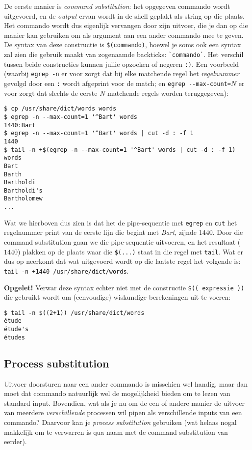 \documentclass[a4paper,twoside,openany]{memoir}
\begin{document}
De eerste manier is \emph{command substitution}: het opgegeven commando wordt
uitgevoerd, en de \emph{output} ervan wordt in de shell geplakt als string op
die plaats. Het commando wordt dus eigenlijk vervangen door zijn uitvoer, die
je dan op die manier kan gebruiken om als argument aan een ander commando mee
te geven. De syntax van deze constructie is \verb!$(commando)!, hoewel je soms
ook een syntax zal zien die gebruik maakt van zogenaamde backticks:
\verb!`commando`!. Het verschil tussen beide constructies kunnen jullie
opzoeken of negeren \verb!:)!. Een voorbeeld (waarbij \verb!egrep -n! er voor
zorgt dat bij elke matchende regel het \emph{regelnummer} gevolgd door een
\verb!:! wordt afgeprint voor de match; en \verb!egrep --max-count=!$N$ er voor
zorgt dat slechts de eerste $N$ matchende regels worden teruggegeven):

\begin{verbatim}
$ cp /usr/share/dict/words words
$ egrep -n --max-count=1 '^Bart' words
1440:Bart
$ egrep -n --max-count=1 '^Bart' words | cut -d : -f 1
1440
$ tail -n +$(egrep -n --max-count=1 '^Bart' words | cut -d : -f 1) words
Bart
Barth
Bartholdi
Bartholdi's
Bartholomew
...
\end{verbatim}

Wat we hierboven dus zien is dat het de pipe-sequentie met \verb!egrep! en
\verb!cut! het regelnummer print van de eerste lijn die begint met \emph{Bart},
zijnde $1440$. Door die command substitution gaan we die pipe-sequentie
uitvoeren, en het resultaat ($1440$) plakken op de plaats waar die
\verb!$(...)! staat in die regel met \verb!tail!. Wat er dus op neerkomt dat
wat uitgevoerd wordt op die laatste regel het volgende is: \verb!tail -n +1440 /usr/share/dict/words!.

\textbf{Opgelet!} Verwar deze syntax echter niet met de constructie \verb!$(( expressie ))! die gebruikt wordt om (eenvoudige) wiskundige berekeningen uit te voeren:
\begin{verbatim}
$ tail -n $((2+1)) /usr/share/dict/words
étude
étude's
études
\end{verbatim}

\subsection{Process substitution}

Uitvoer doorsturen naar een ander commando is misschien wel handig, maar dan moet dat
commando natuurlijk wel de mogelijkheid bieden om te lezen van standard input.
Bovendien, wat als je nu om de een of andere manier de uitvoer van meerdere
\emph{verschillende} processen wil pipen als verschillende inputs van een
commando? Daarvoor kan je \emph{process substitution} gebruiken (wat helaas
nogal makkelijk om te verwarren is qua naam met de command substitution van
eerder).
\end{document}
